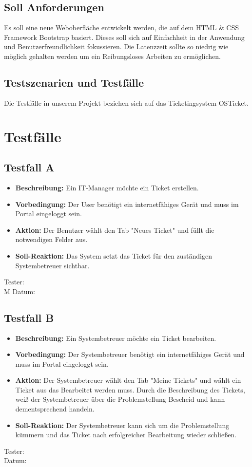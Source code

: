 \subsection{Soll Anforderungen}
Es soll eine neue Weboberfläche entwickelt werden, die auf dem HTML \& CSS Framework Bootstrap basiert. Dieses soll sich auf Einfachheit in der Anwendung und Benutzerfreundlichkeit fokussieren. Die Latenzzeit sollte so niedrig wie möglich gehalten werden um ein Reibungsloses Arbeiten zu ermöglichen.

\subsection{Testszenarien und Testfälle}
Die Testfälle in unserem Projekt beziehen sich auf das Ticketingsystem OSTicket.

\section{Testfälle}
\subsection{Testfall A}
\begin{itemize}
	\item \textbf{Beschreibung:} Ein IT-Manager möchte ein Ticket erstellen.
	\item \textbf{Vorbedingung:} Der User benötigt ein internetfähiges Gerät und muss im Portal eingeloggt sein.
	\item \textbf{Aktion:} Der Benutzer wählt den Tab "Neues Ticket" und füllt die notwendigen Felder aus.
	\item \textbf{Soll-Reaktion:} Das System setzt das Ticket für den zuständigen Systembetreuer sichtbar.
\end{itemize}
Tester:
\\M
Datum:

\subsection{Testfall B}
\begin{itemize}
	\item \textbf{Beschreibung:} Ein Systembetreuer möchte ein Ticket bearbeiten.
	\item \textbf{Vorbedingung:} Der Systembetreuer benötigt ein internetfähiges Gerät und muss im Portal eingeloggt sein.
	\item \textbf{Aktion:} Der Systembetreuer wählt den Tab "Meine Tickets" und wählt ein Ticket aus das Bearbeitet werden muss. Durch die Beschreibung des Tickets, weiß der Systembetreuer über die Problemstellung Bescheid und kann dementsprechend handeln.
	\item \textbf{Soll-Reaktion:} Der Systembetreuer kann sich um die Problemstellung kümmern und das Ticket nach erfolgreicher Bearbeitung wieder schließen.
\end{itemize}
Tester:
\\
Datum:

